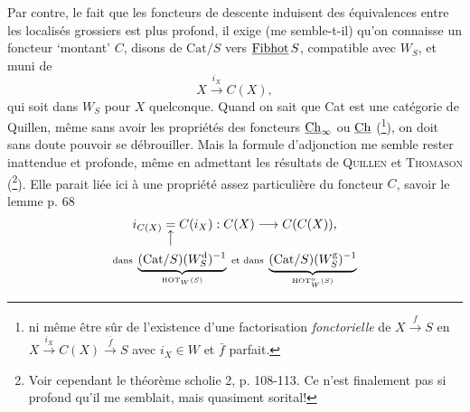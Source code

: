 Par contre, le fait que les foncteurs de descente induisent des équivalences entre les localisés grossiers est plus profond, il exige (me semble-t-il) qu’on connaisse un foncteur ‘montant’ $C$, disons de $\mathrm{Cat}/S$ vers $\underline{\mathrm{Fibhot}}\,S$, compatible avec $W_S$, et muni de
\[
X \xrightarrow{i_X} C(X),
\]
qui soit dans $W_S$ pour $X$ quelconque. Quand on sait que Cat est une catégorie de Quillen, même sans avoir les propriétés des foncteurs $\underline{\mathrm{Ch}}_\infty$ ou $\underline{\mathrm{Ch}}$ (\footnote[52]{ni même être sûr de l’existence d’une factorisation \textit{fonctorielle} de $X \xrightarrow{f} S$ en $X \xrightarrow{i_X} C(X) \xrightarrow{\bar{f}} S$ avec $i_X \in W$ et $\bar{f}$ parfait.}), on doit sans doute
pouvoir se débrouiller. Mais la formule d’adjonction me semble rester inattendue et profonde, même en admettant les résultats de \textsc{Quillen} et \textsc{Thomason} (\footnote[53]{Voir cependant le théorème scholie 2, p. 108-113. Ce n’est finalement pas si profond qu’il me semblait, mais quasiment sorital!}). Elle parait liée ici à une propriété assez particulière du foncteur $C$, savoir le lemme p. 68
\[
\begin{gathered}
i_{C(X)} \underset{\big\uparrow}{=} C(i_X) : C(X) \longrightarrow C(C(X)),\\
\scriptstyle \text{dans } \underbrace{(\mathrm{Cat}/S)(W_S^{\mathrm{d}})^{-1}}_{\mathrm{HOT}_W(S)} \text{ et dans } \underbrace{(\mathrm{Cat}/S)(W_S^{\mathrm{g}})^{-1}}_{\mathrm{HOT}^{o}_{W}(S)}
\end{gathered}
\]
